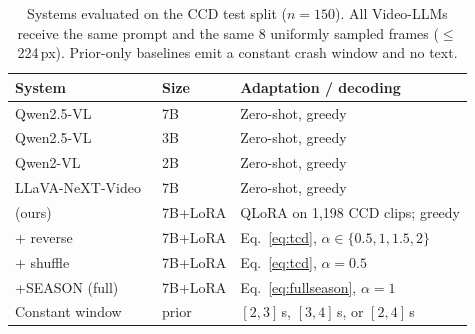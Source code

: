 \begin{table}[!t]
\centering
\caption{Systems evaluated on the CCD test split ($n{=}150$). All Video-LLMs receive the same prompt and the same 8 uniformly sampled frames ($\leq$224\,px). Prior-only baselines emit a constant crash window and no text.}
\label{tab:baselines}
\small
\begin{tabular}{@{}llp{3.1cm}@{}}
\toprule
\textbf{System} & \textbf{Size} & \textbf{Adaptation / decoding} \\
\midrule
Qwen2.5-VL~\cite{qwen25vl}          & 7B & Zero-shot, greedy \\
Qwen2.5-VL~\cite{qwen25vl}          & 3B & Zero-shot, greedy \\
Qwen2-VL~\cite{qwen2vl}             & 2B & Zero-shot, greedy \\
LLaVA-NeXT-Video~\cite{llavanextvideo} & 7B & Zero-shot, greedy \\
\midrule
\crashlogic{} (ours)                & 7B+LoRA & QLoRA on 1{,}198 CCD clips; greedy \\
\quad +\tcd{} reverse               & 7B+LoRA & Eq.~\eqref{eq:tcd}, $\alpha\in\{0.5,1,1.5,2\}$ \\
\quad +\tcd{} shuffle               & 7B+LoRA & Eq.~\eqref{eq:tcd}, $\alpha{=}0.5$ \\
\quad +SEASON (full)                & 7B+LoRA & Eq.~\eqref{eq:fullseason}, $\alpha{=}1$ \\
\midrule
Constant window                     & prior   & $[2,3]$\,s, $[3,4]$\,s, or $[2,4]$\,s \\
\bottomrule
\end{tabular}
\end{table}
